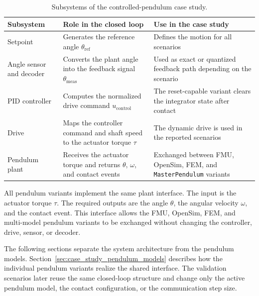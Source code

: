 \begin{table}[tbp]
    \centering
    \small
    \caption[Subsystems of the controlled-pendulum case study]{Subsystems of the controlled-pendulum case study.}
    \label{tab:case_study_subsystems}
    \begin{tabular}{p{3.0cm}p{5.0cm}p{5.6cm}}
        \toprule
        \textbf{Subsystem} & \textbf{Role in the closed loop} & \textbf{Use in the case study} \\
        \midrule
        Setpoint
        & Generates the reference angle \(\theta_{\mathrm{ref}}\)
        & Defines the motion for all scenarios \\
        \addlinespace
        Angle sensor and decoder
        & Converts the plant angle into the feedback signal \(\theta_{\mathrm{meas}}\)
        & Used as exact or quantized feedback path depending on the scenario \\
        \addlinespace
        \ac{PID} controller
        & Computes the normalized drive command \(u_{\mathrm{control}}\)
        & The reset-capable variant clears the integrator state after contact \\
        \addlinespace
        Drive
        & Maps the controller command and shaft speed to the actuator torque \(\tau\)
        & The dynamic drive is used in the reported scenarios \\
        \addlinespace
        Pendulum plant
        & Receives the actuator torque and returns \(\theta\), \(\omega\), and contact events
        & Exchanged between \ac{FMU}, OpenSim, \ac{FEM}, and \texttt{MasterPendulum} variants \\
        \bottomrule
    \end{tabular}
\end{table}

All pendulum variants implement the same plant interface.
The input is the actuator torque \(\tau\).
The required outputs are the angle \(\theta\), the angular velocity \(\omega\), and the contact event.
This interface allows the \ac{FMU}, OpenSim, \ac{FEM}, and multi-model pendulum variants to be exchanged without changing the controller, drive, sensor, or decoder.

The following sections separate the system architecture from the pendulum models.
Section~\ref{sec:case_study_pendulum_models} describes how the individual pendulum variants realize the shared interface.
The validation scenarios later reuse the same closed-loop structure and change only the active pendulum model, the contact configuration, or the communication step size.
